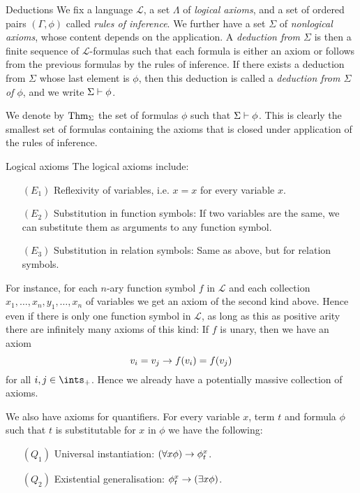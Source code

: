 \documentclass[article, a4paper, 11pt, oneside]{memoir}
\numberwithin{equation}{chapter}
\newcommand{\calL}{\mathcal{L}}
\theoremstyle{nonumberplain}
\newcommand{\posints}{\ints_+}
\begin{document}
\begin{notelist}
    \item[Deductions]
    We fix a language $\calL$, a set $\Lambda$ of \emph{logical axioms}, and a set of ordered pairs $(\Gamma,\phi)$ called \emph{rules of inference}. We further have a set $\Sigma$ of \emph{nonlogical axioms}, whose content depends on the application. A \emph{deduction from $\Sigma$} is then a finite sequence of $\calL$-formulas such that each formula is either an axiom or follows from the previous formulas by the rules of inference. If there exists a deduction from $\Sigma$ whose last element is $\phi$, then this deduction is called a \emph{deduction from $\Sigma$ of $\phi$}, and we write $\Sigma \vdash \phi$.

    We denote by $\mathrm{Thm}_{\Sigma}$ the set of formulas $\phi$ such that $\Sigma \vdash \phi$. This is clearly the smallest set of formulas containing the axioms that is closed under application of the rules of inference.

    \item[Logical axioms]
    The logical axioms include:
    \begin{enumerate}
        \item[$(E_1)$] Reflexivity of variables, i.e. $x = x$ for every variable $x$.
        \item[$(E_2)$] Substitution in function symbols: If two variables are the same, we can substitute them as arguments to any function symbol.
        \item[$(E_3)$] Substitution in relation symbols: Same as above, but for relation symbols.
    \end{enumerate}
    For instance, for each $n$-ary function symbol $f$ in $\calL$ and each collection $x_1, \ldots, x_n, y_1, \ldots, x_n$ of variables we get an axiom of the second kind above. Hence even if there is only one function symbol in $\calL$, as long as this as positive arity there are infinitely many axioms of this kind: If $f$ is unary, then we have an axiom
    \begin{equation*}
        v_i = v_j \rightarrow f(v_i) = f(v_j)
    \end{equation*}
    for all $i,j \in \posints$. Hence we already have a potentially massive collection of axioms.

    We also have axioms for quantifiers. For every variable $x$, term $t$ and formula $\phi$ such that $t$ is substitutable for $x$ in $\phi$ we have the following:
    \begin{enumerate}
        \item[$(Q_1)$] Universal instantiation: $(\forall x \phi) \rightarrow \phi^x_t$.
        \item[$(Q_2)$] Existential generalisation: $\phi^x_t \rightarrow (\exists x \phi)$.
    \end{enumerate}


\end{notelist}
\end{document}

